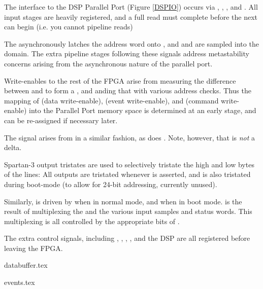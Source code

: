 The interface to the DSP Parallel Port (Figure \ref{DSPIO}) occurs via
, , , and . All
input stages are heavily registered, and a full read must complete
before the next can begin (i.e. you cannot pipeline reads)

The  asynchronously latches the address word onto
, and  and  are sampled into
the  domain. The extra pipeline stages following these
signals address metastability concerns arising from the asynchronous
nature of the parallel port.
  
Write-enables to the rest of the FPGA arise from measuring the
difference between  and  to form a
, and anding that with various address checks. Thus
the mapping of  (data write-enable),  (event
write-enable), and  (command write-enable) into the
Parallel Port memory space is determined at an early stage, and can be
re-assigned if necessary later.
    
The signal  arises from  in a similar
fashion, as does . Note, however, that  is
\textit{not} a delta.
  
Spartan-3 output tristates are used to selectively tristate the high
and low bytes of the  lines: All outputs are tristated
whenever  is asserted, and  is also
tristated during boot-mode (to allow for 24-bit addressing, currently
unused).
  
Similarly,  is driven by  when in
normal mode, and  when in boot mode. is
the result of multiplexing the  and the various
input samples and status words. This multiplexing is all controlled by
the appropriate bits of .


The extra control signals, including , ,
, , and the DSP  are all
registered before leaving the FPGA.
    

{databuffer.tex}

{events.tex}
